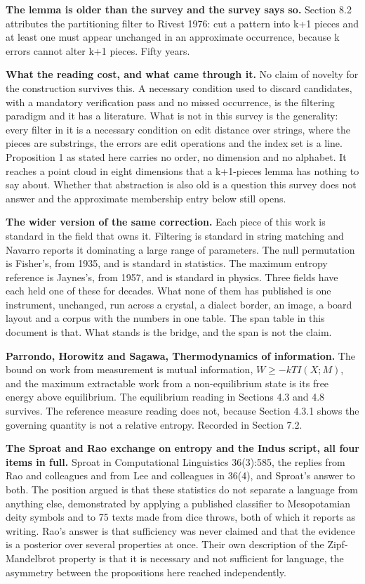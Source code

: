 \textbf{The lemma is older than the survey and the survey says so.} Section 8.2 attributes the partitioning filter to Rivest 1976: cut a pattern into k+1 pieces and at least one must appear unchanged in an approximate occurrence, because k errors cannot alter k+1 pieces. Fifty years.

\textbf{What the reading cost, and what came through it.} No claim of novelty for the construction survives this. A necessary condition used to discard candidates, with a mandatory verification pass and no missed occurrence, is the filtering paradigm and it has a literature. What is not in this survey is the generality: every filter in it is a necessary condition on edit distance over strings, where the pieces are substrings, the errors are edit operations and the index set is a line. Proposition 1 as stated here carries no order, no dimension and no alphabet. It reaches a point cloud in eight dimensions that a k+1-pieces lemma has nothing to say about. Whether that abstraction is also old is a question this survey does not answer and the approximate membership entry below still opens.

\textbf{The wider version of the same correction.} Each piece of this work is standard in the field that owns it. Filtering is standard in string matching and Navarro reports it dominating a large range of parameters. The null permutation is Fisher's, from 1935, and is standard in statistics. The maximum entropy reference is Jaynes's, from 1957, and is standard in physics. Three fields have each held one of these for decades. What none of them has published is one instrument, unchanged, run across a crystal, a dialect border, an image, a board layout and a corpus with the numbers in one table. The span table in this document is that. What stands is the bridge, and the span is not the claim.

\textbf{Parrondo, Horowitz and Sagawa, Thermodynamics of information.} The bound on work from measurement is mutual information, \(W \ge -kTI(X;M)\), and the maximum extractable work from a non-equilibrium state is its free energy above equilibrium. The equilibrium reading in Sections 4.3 and 4.8 survives. The reference measure reading does not, because Section 4.3.1 shows the governing quantity is not a relative entropy. Recorded in Section 7.2.

\textbf{The Sproat and Rao exchange on entropy and the Indus script, all four items in full.} Sproat in Computational Linguistics 36(3):585, the replies from Rao and colleagues and from Lee and colleagues in 36(4), and Sproat's answer to both. The position argued is that these statistics do not separate a language from anything else, demonstrated by applying a published classifier to Mesopotamian deity symbols and to 75 texts made from dice throws, both of which it reports as writing. Rao's answer is that sufficiency was never claimed and that the evidence is a posterior over several properties at once. Their own description of the Zipf-Mandelbrot property is that it is necessary and not sufficient for language, the asymmetry between the propositions here reached independently.

